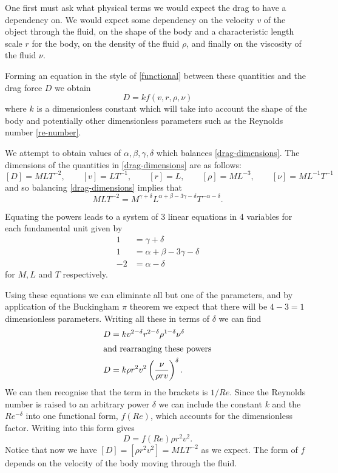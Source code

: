 One first must ask what physical terms we would expect the drag to have a dependency on. We would
expect some dependency on the velocity $v$ of the object through the fluid, on the shape of the body and
a characteristic length scale $r$ for the body, on the density of the fluid $\rho$, and finally on
the viscosity of the fluid $\nu$.

Forming an equation in the style of \eqref{functional} between these quantities and the drag force 
$D$ we obtain
\begin{equation} \label{drag-dimensions}
D = k f(v, r, \rho, \nu)
\end{equation}
where $k$ is a dimensionless constant which will take into account the shape of the body and
potentially other dimensionless parameters such as the Reynolds number \eqref{re-number}.

We attempt to obtain values of $\alpha, \beta, \gamma, \delta$ which balances \eqref{drag-dimensions}.
The dimensions of the quantities in \eqref{drag-dimensions} are as follows:
\begin{equation} \nonumber
[D] = M L T^{-2}, \qquad [v] = L T^{-1}, \qquad [r] = L, \qquad [\rho] = M L^{-3}, \qquad [\nu] = M L^{-1} T^{-1}
\end{equation}
and so balancing \eqref{drag-dimensions} implies that
\begin{equation}
M L T^{-2} = M^{\gamma + \delta} L^{\alpha + \beta - 3\gamma - \delta} T^{-\alpha-\delta} .
\end{equation}

Equating the powers leads to a system of 3 linear equations in 4 variables for each fundamental unit
given by
\begin{subequations}
\begin{align}
1 &= \gamma + \delta \\
1 &= \alpha + \beta - 3 \gamma - \delta \\
-2 &= \alpha - \delta
\end{align}
\end{subequations}
for $M, L$ and $T$ respectively.

Using these equations we can eliminate all but one of the parameters, and by application of the Buckingham
$\pi$ theorem we expect that there will be $4-3=1$ dimensionless parameters. Writing all these in terms
of $\delta$ we can find
\begin{align}
D &= k v^{2-\delta} r^{2-\delta} \rho^{1-\delta} \nu^{\delta} \\
\shortintertext{and rearranging these powers}
D &= k \rho r^2 v^2 \left(\frac{\nu}{\rho r v}\right)^{\delta} .
\end{align}
We can then recognise that the term in the brackets is $1/Re$. Since the Reynolds number is raised to
an arbitrary power $\delta$ we can include the constant $k$ and the $Re^{-\delta}$ into one functional
form, $f(Re)$, which accounts for the dimensionless factor. Writing into this form gives
\begin{equation} \label{drag-functional}
D = f(Re) \rho r^2 v^2 .
\end{equation}
Notice that now we have $[D] = [\rho r^2 v^2] = MLT^{-2}$ as we expect. 
The form of $f$ depends on the velocity of the body moving through the fluid.

